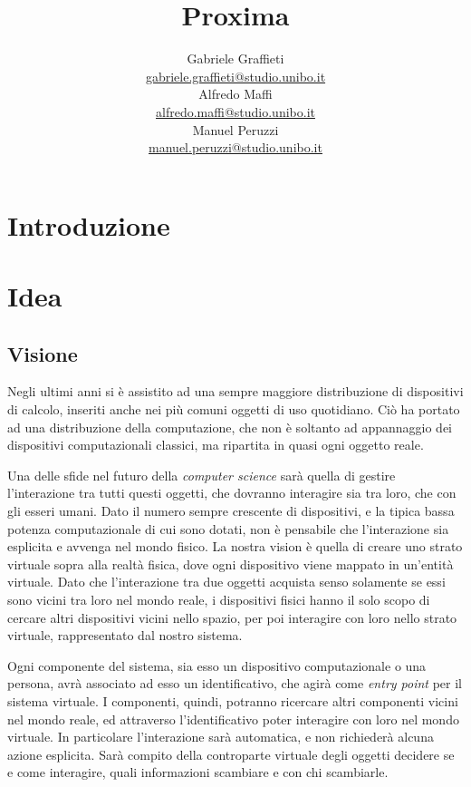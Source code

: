 \documentclass[a4paper,12pt]{report}
\title{\Huge \textbf{Proxima} \\
	\vspace{10pt}
	\vspace{20pt}
}
\author{
	Gabriele Graffieti \\ \small \url{gabriele.graffieti@studio.unibo.it}
	\vspace{15pt}
	\\
	Alfredo Maffi \\ \small \url{alfredo.maffi@studio.unibo.it}
	\vspace{15pt}
	\\
	Manuel Peruzzi \\ \small \url{manuel.peruzzi@studio.unibo.it}
}
\date{}
\begin{document}
\maketitle
{}


\tableofcontents

\chapter{Introduzione}

\chapter{Idea}
\section{Visione}
Negli ultimi anni si è assistito ad una sempre maggiore distribuzione di dispositivi di calcolo, inseriti anche nei più comuni oggetti di uso quotidiano. Ciò ha portato ad una distribuzione della computazione, che non è soltanto ad appannaggio dei dispositivi computazionali classici, ma ripartita in quasi ogni oggetto reale. 

Una delle sfide nel futuro della \emph{computer science} sarà quella di gestire l'interazione tra tutti questi oggetti, che dovranno interagire sia tra loro, che con gli esseri umani. Dato il numero sempre crescente di dispositivi, e la tipica bassa potenza computazionale di cui sono dotati, non è pensabile che l'interazione sia esplicita e avvenga nel mondo fisico. La nostra vision è quella di creare uno strato virtuale sopra alla realtà fisica, dove ogni dispositivo viene mappato in un'entità virtuale. Dato che l'interazione tra due oggetti acquista senso solamente se essi sono vicini tra loro nel mondo reale, i dispositivi fisici hanno il solo scopo di cercare altri dispositivi vicini nello spazio, per poi interagire con loro nello strato virtuale, rappresentato dal nostro sistema. 

Ogni componente del sistema, sia esso un dispositivo computazionale o una persona, avrà associato ad esso un identificativo, che agirà come \emph{entry point} per il sistema virtuale. I componenti, quindi, potranno ricercare altri componenti vicini nel mondo reale, ed attraverso l'identificativo poter interagire con loro nel mondo virtuale. In particolare l'interazione sarà automatica, e non richiederà alcuna azione esplicita. Sarà compito della controparte virtuale degli oggetti decidere se e come interagire, quali informazioni scambiare e con chi scambiarle.
\end{document}

